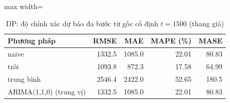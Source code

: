 \begin{table}[H]
\centering\small
\caption{DP: độ chính xác dự báo đa bước từ gốc cố định $t=1500$ (thang giá)}\label{tab:tab_b12_11_dp_multistep}
\begin{adjustbox}{max width=\linewidth}
\begin{tabular}{lrrrr}
\toprule
Phương pháp & RMSE & MAE & MAPE (\%) & MASE \\
\midrule
naive & 1332.5 & 1085.0 & 22.01 & 80.83 \\
trôi & 1093.8 & 872.3 & 17.58 & 64.99 \\
trung bình & 2546.4 & 2422.0 & 52.65 & 180.5 \\
ARIMA(1,1,0) (trung vị) & 1332.5 & 1085.0 & 22.01 & 80.83 \\
\bottomrule
\end{tabular}
\end{adjustbox}
\end{table}
